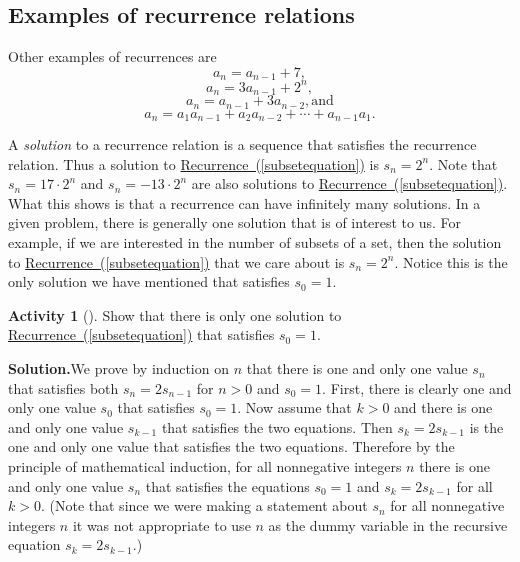 \documentclass[10pt,]{book}
\theoremstyle{plain}
\theoremstyle{definition}
\newtheorem{activity}[project]{Activity}
\numberwithin{equation}{chapter}
\begin{document}
\subsection[{Examples of recurrence relations}]{Examples of recurrence relations}\label{subsection-11}
Other examples of recurrences are%
\begin{equation}
a_n = a_{n-1} +
7,\label{arithmeticexample}
\end{equation}
%
\begin{equation}
a_n =3a_{n-1} + 2^n,\label{geometricdriven}
\end{equation}
%
\begin{equation}
a_n = a_{n-1} + 3a_{n-2},\mbox{
and}\label{secondorderlinear}
\end{equation}
%
\begin{equation}
a_n= a_1a_{n-1} + a_2a_{n-2}+\cdots +
a_{n-1}a_1.\label{Catalanrecurrence}
\end{equation}
%
\par
A \emph{solution} to a recurrence relation is a sequence that satisfies the recurrence relation. Thus a solution to \hyperref[subsetequation]{Recurrence~(\ref{subsetequation})} is \(s_n =2^n\). Note that \(s_n=17\cdot2^n\) and \(s_n=-13\cdot2^n\) are also solutions to \hyperref[subsetequation]{Recurrence~(\ref{subsetequation})}. What this shows is that a recurrence can have infinitely many solutions. In a given problem, there is generally one solution that is of interest to us. For example, if we are interested in the number of subsets of a set, then the solution to \hyperref[subsetequation]{Recurrence~(\ref{subsetequation})} that we care about is \(s_n=2^n\). Notice this is the only solution we have mentioned that satisfies \(s_0=1\).%
\begin{activity}[]\label{activity-37}
Show that there is only one solution to \hyperref[subsetequation]{Recurrence~(\ref{subsetequation})} that satisfies \(s_0=1\).%
\par\medskip\noindent%
\textbf{Solution.}\quad We prove by induction on \(n\) that there is one and only one value \(s_n\) that satisfies both \(s_n=2s_{n-1}\) for \(n>0\) and \(s_0=1\). First, there is clearly one and only one value \(s_0\) that satisfies \(s_0=1\). Now assume that \(k>0\) and there is one and only one value \(s_{k-1}\) that satisfies the two equations. Then \(s_k=2s_{k-1}\) is the one and only one value that satisfies the two equations. Therefore by the principle of mathematical induction, for all nonnegative integers \(n\) there is one and only one value \(s_n\) that satisfies the equations \(s_0=1\) and \(s_k=2s_{k-1}\) for all \(k>0\). (Note that since we were making a statement about \(s_n\) for all nonnegative integers \(n\) it was not appropriate to use \(n\) as the dummy variable in the recursive equation \(s_k=2s_{k-1}\).)%
\end{activity}
\end{document}
